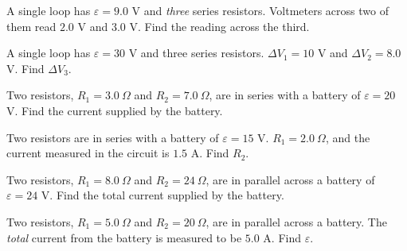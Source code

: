 \documentclass[12pt]{article}
\begin{document}

\prob A single loop has $\varepsilon=9.0$ V and \emph{three} series
resistors. Voltmeters across two of them read $2.0$ V and $3.0$ V. Find
the reading across the third.


\prob A single loop has $\varepsilon=30$ V and three series resistors.
$\Delta V_1=10$ V and $\Delta V_2=8.0$ V. Find $\Delta V_3$.


\prob Two resistors, $R_1=3.0\ \Omega$ and $R_2=7.0\ \Omega$, are in
series with a battery of $\varepsilon=20$ V. Find the current supplied by
the battery.


\prob Two resistors are in series with a battery of $\varepsilon=15$ V.
$R_1=2.0\ \Omega$, and the current measured in the circuit is $1.5$ A.
Find $R_2$.


\prob Two resistors, $R_1=8.0\ \Omega$ and $R_2=24\ \Omega$, are in
parallel across a battery of $\varepsilon=24$ V. Find the total current
supplied by the battery.


\prob Two resistors, $R_1=5.0\ \Omega$ and $R_2=20\ \Omega$, are in
parallel across a battery. The \emph{total} current from the battery is
measured to be $5.0$ A. Find $\varepsilon$.

\end{document}
